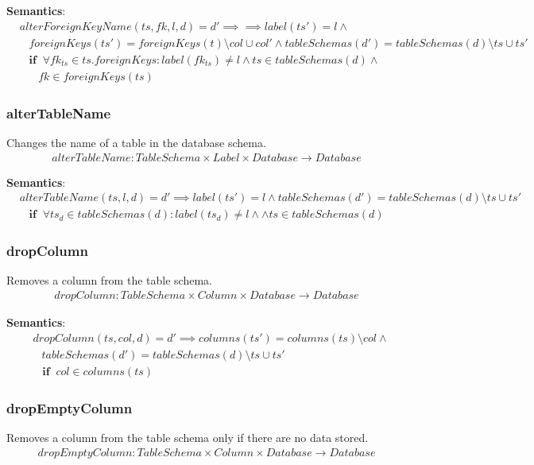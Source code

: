 \documentclass[10pt]{article}
\begin{document}
\noindent \textbf{Semantics}:
\begin{align}
& alterForeignKeyName(ts, fk, l, d) = d' \implies \implies label(ts') = l \land \nonumber \\
& \;\;\; foreignKeys(ts') = foreignKeys(t) \setminus col \cup col' \land tableSchemas(d') = tableSchemas(d) \setminus ts \cup ts'  \nonumber \\
& \;\;\; \mathbf{if}  \;\;  \forall fk_{ts} \in ts.foreignKeys : label(fk_{ts}) \neq l \land ts \in tableSchemas(d) \land \nonumber \\
& \;\;\;\;\;\; fk \in foreignKeys(ts) 
\end{align}

\subsubsection{alterTableName}
Changes the name of a table in the database schema.
\begin{align}
alterTableName: TableSchema \times Label \times Database \rightarrow Database
\end{align}

\noindent \textbf{Semantics}:
\begin{align}
& alterTableName(ts, l, d) = d' \implies label(ts') = l \land tableSchemas(d') = tableSchemas(d) \setminus ts \cup ts'  \nonumber \\
& \;\;\; \mathbf{if}  \;\;  \forall ts_d \in tableSchemas(d) : label(ts_d) \neq l \land \land ts \in tableSchemas(d) 
\end{align}

\subsubsection{dropColumn}
Removes a column from the table schema.
\begin{align}
dropColumn: TableSchema \times Column \times Database \rightarrow Database
\end{align}

\noindent \textbf{Semantics}:
\begin{align}
& dropColumn(ts, col, d) = d' \implies columns(ts') = columns(ts) \setminus col \land \nonumber \\
& \;\;\ tableSchemas(d') = tableSchemas(d) \setminus ts \cup ts'  \nonumber \\
& \;\;\; \mathbf{if}  \;\; col \in columns(ts)
\end{align}

\subsubsection{dropEmptyColumn}
Removes a column from the table schema only if there are no data stored.
\begin{align}
dropEmptyColumn: TableSchema \times Column \times Database \rightarrow Database
\end{align}
\end{document}
